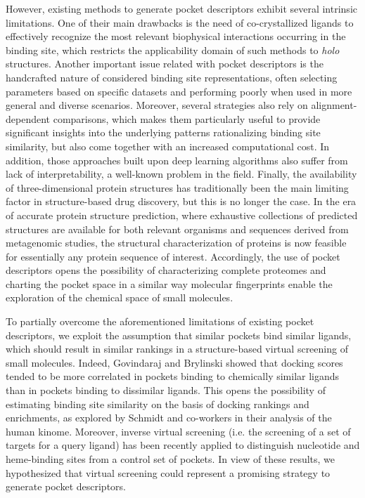 However, existing methods to generate pocket descriptors exhibit several intrinsic limitations. One of their main drawbacks is the need of co-crystallized ligands to effectively recognize the most relevant biophysical interactions occurring in the binding site, which restricts the applicability domain of such methods to \textit{holo} structures\cite{wood_pharmacophore_2012, desaphy_encoding_2013}. Another important issue related with pocket descriptors is the handcrafted nature of considered binding site representations, often selecting parameters based on specific datasets and performing poorly when used in more general and diverse scenarios\cite{ehrt_benchmark_2018}. Moreover, several strategies also rely on alignment-dependent comparisons, which makes them particularly useful to provide significant insights into the underlying patterns rationalizing binding site similarity, but also come together with an increased computational cost\cite{schalon_simple_2008}. In addition, those approaches built upon deep learning algorithms also suffer from lack of interpretability, a well-known problem in the field\cite{jimenez-luna_artificial_2021, vamathevan_applications_2019, ching_opportunities_2018}. Finally, the availability of three-dimensional protein structures has traditionally been the main limiting factor in structure-based drug discovery, but this is no longer the case. In the era of accurate protein structure prediction\cite{jumper_highly_2021, tunyasuvunakool_highly_2021, varadi_alphafold_2022}, where exhaustive collections of predicted structures are available for both relevant organisms\cite{david_alphafold_2022} and sequences derived from metagenomic studies\cite{lin_evolutionary-scale_2022}, the structural characterization of proteins is now feasible for essentially any protein sequence of interest. Accordingly, the use of pocket descriptors opens the possibility of characterizing complete proteomes and charting the pocket space in a similar way molecular fingerprints enable the exploration of the chemical space of small molecules\cite{lipinski_navigating_2004, willett_similarity-based_2006, capecchi_one_2020}.

To partially overcome the aforementioned limitations of existing pocket descriptors, we exploit the assumption that similar pockets bind similar ligands, which should result in similar rankings in a structure-based virtual screening of small molecules. Indeed, Govindaraj and Brylinski\cite{govindaraj_comparative_2018} showed that docking scores tended to be more correlated in pockets binding to chemically similar ligands than in pockets binding to dissimilar ligands. This opens the possibility of estimating binding site similarity on the basis of docking rankings and enrichments, as explored by Schmidt and co-workers in their analysis of the human kinome\cite{schmidt_analyzing_2021}. Moreover, inverse virtual screening (i.e. the screening of a set of targets for a query ligand) has been recently applied to distinguish nucleotide and heme-binding sites from a control set of pockets\cite{pu_deepdrug3d_2019}. In view of these results, we hypothesized that virtual screening could represent a promising strategy to generate pocket descriptors.

